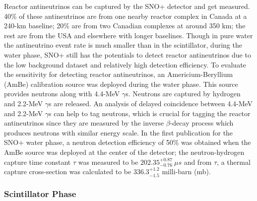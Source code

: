 Reactor antineutrinos can be captured by the SNO+ detector and get measured. 40\% of these antineutrinos are from one nearby reactor complex in Canada at a 240-km baseline; 20\% are from two Canadian complexes at around 350 km; the rest are from the USA and elsewhere with longer baselines\cite{whitepaper}. Though in pure water the antineutrino event rate is much smaller than in the scintillator, during the water phase, SNO+ still has the potentials to detect reactor antineutrinos due to the low background dataset and relatively high detection efficiency. To evaluate the sensitivity for detecting reactor antineutrinos, an Americium-Beryllium (AmBe) calibration source was deployed during the water phase. This source provides neutrons along with 4.4-MeV $\gamma$s. Neutrons are captured by hydrogen and 2.2-MeV $\gamma$s are released. An analysis of delayed coincidence between 4.4-MeV and 2.2-MeV $\gamma$s can help to tag neutrons, which is crucial for tagging the reactor antineutrinos since they are measured by the inverse $\beta$-decay process which produces neutrons with similar energy scale. In the first publication for the SNO+ water phase, a neutron detection efficiency of 50\% was obtained when the AmBe source was deployed at the center of the detector; the neutron-hydrogen capture time constant $\tau$ was measured to be $202.35_{-0.76}^{+0.87}~\mu s$ and from $\tau$, a thermal capture cross-section was calculated to be $336.3^{+1.2}_{-1.5}$ milli-barn (mb)\cite{anderson2020measurement}.



\subsubsection{Scintillator Phase}


